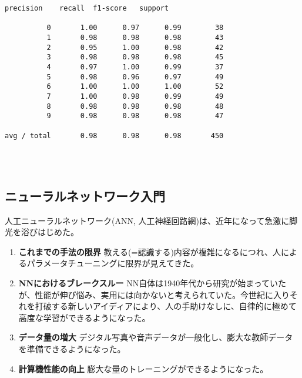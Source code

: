 \documentclass[11pt]{article}
\begin{document}
    \begin{Verbatim}[commandchars=\\\{\}]
             precision    recall  f1-score   support

          0       1.00      0.97      0.99        38
          1       0.98      0.98      0.98        43
          2       0.95      1.00      0.98        42
          3       0.98      0.98      0.98        45
          4       0.97      1.00      0.99        37
          5       0.98      0.96      0.97        49
          6       1.00      1.00      1.00        52
          7       1.00      0.98      0.99        49
          8       0.98      0.98      0.98        48
          9       0.98      0.98      0.98        47

avg / total       0.98      0.98      0.98       450


    \end{Verbatim}

    \begin{center}
    \end{center}
    { \hspace*{\fill} \\}
    
    \subsection{ニューラルネットワーク入門}\label{ux30cbux30e5ux30fcux30e9ux30ebux30cdux30c3ux30c8ux30efux30fcux30afux5165ux9580}

人工ニューラルネットワーク(ANN,
人工神経回路網)は、近年になって急激に脚光を浴びはじめた。

\begin{enumerate}
\def\labelenumi{\arabic{enumi}.}
\item
  \textbf{これまでの手法の限界}
  教える(=認識する)内容が複雑になるにつれ、人によるパラメータチューニングに限界が見えてきた。
\item
  \textbf{NNにおけるブレークスルー}
  NN自体は1940年代から研究が始まっていたが、性能が伸び悩み、実用には向かないと考えられていた。今世紀に入りそれを打破する新しいアイディアにより、人の手助けなしに、自律的に極めて高度な学習ができるようになった。
\item
  \textbf{データ量の増大}
  デジタル写真や音声データが一般化し、膨大な教師データを準備できるようになった。
\item
  \textbf{計算機性能の向上} 膨大な量のトレーニングができるようになった。
\end{enumerate}
\end{document}
